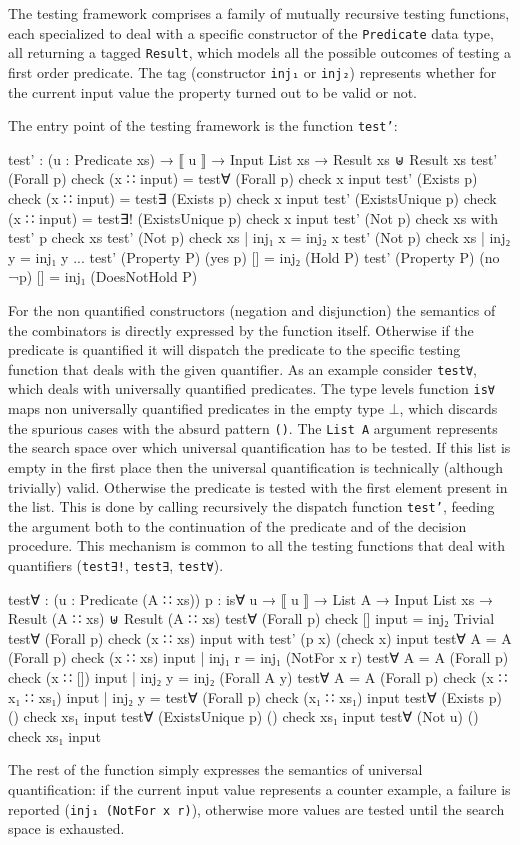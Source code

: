 \documentclass[10pt,a4paper]{article}
\begin{document}
The testing framework comprises a family of mutually recursive testing functions, each specialized to deal with a specific constructor of the \texttt{Predicate} data type, all returning a tagged \texttt{Result}, which models all the possible outcomes of testing a first order predicate. 
The tag (constructor \texttt{inj₁} or \texttt{inj₂}) represents whether for the current input value the property turned out to be valid or not.

The entry point of the testing framework is the function \texttt{test'}:
\begin{code}
test' : (u : Predicate xs) → ⟦ u ⟧ → Input List xs → Result xs ⊎ Result xs
test' (Forall p) check (x ∷ input) = test∀ (Forall p) check x input
test' (Exists p) check (x ∷ input) = test∃ (Exists p) check x input
test' (ExistsUnique p) check (x ∷ input) = test∃! (ExistsUnique p) check x input
test' (Not p) check xs with test' p check xs
test' (Not p) check xs | inj₁ x = inj₂ x
test' (Not p) check xs | inj₂ y = inj₁ y 
...
test' (Property P) (yes p) [] = inj₂ (Hold P)
test' (Property P) (no ¬p) [] = inj₁ (DoesNotHold P)
\end{code}
For the non quantified constructors (negation and disjunction) the semantics of the combinators is directly expressed by the function itself.
Otherwise if the predicate is quantified it will dispatch the predicate to the specific testing function that deals with the given quantifier.
As an example consider \texttt{test∀}, which deals with universally quantified predicates.
The type levels function \texttt{is∀} maps non universally quantified predicates in the empty type \texttt{$\bot$}, which discards the spurious cases with the  absurd pattern \texttt{()}.
The \texttt{List A} argument represents the search space over which universal quantification has to be tested.
If this list is empty in the first place then the universal quantification is technically (although trivially) valid. Otherwise the predicate is tested with the first element present in the list. This is done by calling recursively the dispatch function \texttt{test'}, feeding the argument both to the continuation of the predicate and of the decision procedure. This mechanism is common to all the testing functions that deal with quantifiers (\texttt{test∃!}, \texttt{test∃}, \texttt{test∀}). 	
\begin{code}
test∀ : (u : Predicate (A ∷ xs)) {p : is∀ u} → ⟦ u ⟧ → List A → 
         Input List xs → Result (A ∷ xs) ⊎ Result (A ∷ xs)
test∀ (Forall p) check [] input = inj₂ Trivial
test∀ (Forall p) check (x ∷ xs) input with test' (p x) (check x) input
test∀ {A = A} (Forall p) check (x ∷ xs) input | inj₁ r = inj₁ (NotFor x r)
test∀ {A = A} (Forall p) check (x ∷ []) input | inj₂ y = inj₂ (Forall A y)
test∀ {A = A} (Forall p) check (x ∷ x₁ ∷ xs₁) input | inj₂ y = 
	test∀ (Forall p) check (x₁ ∷ xs₁) input
test∀ (Exists p) {()} check xs₁ input
test∀ (ExistsUnique p) {()} check xs₁ input
test∀ (Not u) {()} check xs₁ input
\end{code}
The rest of the function simply expresses the semantics of universal quantification: if the current input value represents a counter example, a failure is reported
(\texttt{inj₁ (NotFor x r)}), otherwise more values are tested until the search space is exhausted.
\end{document}
